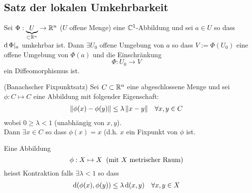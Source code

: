 \subsection{Satz der lokalen Umkehrbarkeit}
\begin{Sat}
  Sei $\Phi:\underbrace{U}_{\subset\mathbb{R}^n}\rightarrow\mathbb{R}^n$ ($U$ offene Menge) eine $\mathbb{C}^1$-Abbildung und sei $a\in U$ so dass $\operatorname{d} \Phi|_a$ umkehrbar ist. Dann $\exists U_0$ offene Umgebung von $a$ so dass $V:=\Phi(U_0)$ eine offene Umgebung von $\Phi(a)$ und die Einschränkung
  \[\Phi:U_0\to V\]
  ein Diffeomorphismus ist.
\end{Sat}
\begin{Lem}(Banachscher Fixpunktsatz)
  Sei $C\subset\mathbb{R}^n$ eine abgeschlossene Menge und sei $\phi:C\mapsto C$ eine Abbildung mit folgender Eigenschaft:
  \begin{align*}
    \left\| \phi(x)-\phi(y) \right\|\leq \lambda\left\| x-y \right\|& &\forall x,y\in C
  \end{align*}
  wobei $0\geq \lambda < 1$ (unabhängig von $x,y$).\\
  Dann $\exists x\in C$ so dass $\phi(x)=x$ (d.h. $x$ ein Fixpunkt von $\phi$ ist.
\end{Lem}
\begin{Def}
  Eine Abbildung
  \[\phi:X\mapsto X\hspace{2mm}(\text{mit $X$ metrischer Raum})\]
  heisst Kontraktion falls $\exists \lambda <1$ so dass
  \begin{align*}
    \operatorname{d} (\phi(x),\phi(y))\leq\lambda\operatorname{d}(x,y)& &\forall x,y\in X
  \end{align*}
\end{Def}
